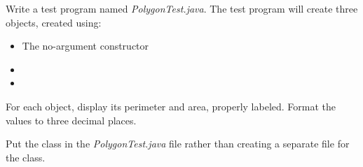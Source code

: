 \begin{exercise}
Write a test program named {\em PolygonTest.java}. The test program will create three  objects, created using:
\begin{itemize}
    \item The no-argument constructor
    \item {}
    \item {}
\end{itemize}

For each object, display its perimeter and area, properly labeled. Format the values to three decimal places.

Put the  class in the {\em PolygonTest.java} file rather than creating a separate file for the class. 
\end{exercise}

